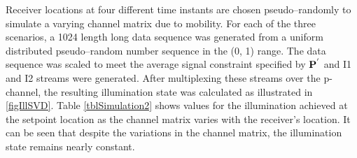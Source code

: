 Receiver locations at four different time instants are chosen pseudo--randomly to simulate a varying channel matrix due to mobility. For each of the three scenarios, a 1024 length long data sequence was generated from a uniform distributed pseudo--random number sequence in the (0, 1) range. The data sequence was scaled to meet the average signal constraint specified by ${\bf{P}}^{'}$ and I1 and I2 streams were generated. After multiplexing these streams over the p-channel, the resulting illumination state was calculated as illustrated in \figurename{ \ref{figIllSVD}}. Table \ref{tblSimulation2} shows values for the illumination achieved at the setpoint location as the channel matrix varies with the receiver's location. It can be seen that despite the variations in the channel matrix, the illumination state remains nearly constant.


